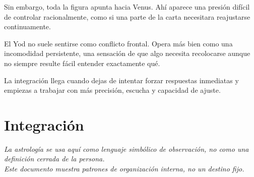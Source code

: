 \documentclass[11pt,a4paper]{article}
\begin{document}
Sin embargo, toda la figura apunta hacia Venus. Ahí aparece una presión difícil de controlar racionalmente, como si una parte de la carta necesitara reajustarse continuamente.

El Yod no suele sentirse como conflicto frontal. Opera más bien como una incomodidad persistente, una sensación de que algo necesita recolocarse aunque no siempre resulte fácil entender exactamente qué.

La integración llega cuando dejas de intentar forzar respuestas inmediatas y empiezas a trabajar con más precisión, escucha y capacidad de ajuste.



\section{Integración}

\vspace{1cm}

\begin{center}
{\small\itshape\color{grisai}
La astrología se usa aquí como lenguaje simbólico de observación, no como una definición cerrada de la persona.\\
Este documento muestra patrones de organización interna, no un destino fijo.
}
\end{center}
\end{document}
